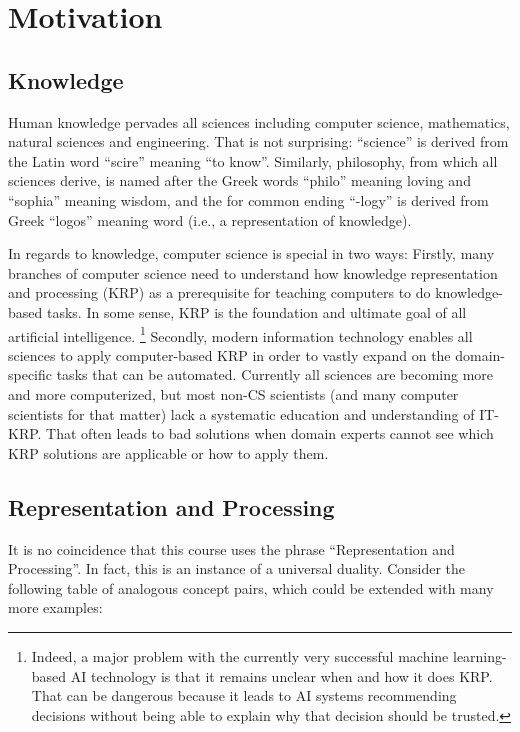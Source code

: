 \section{Motivation}

\subsection{Knowledge}

Human knowledge pervades all sciences including computer science, mathematics, natural sciences and engineering.
That is not surprising: ``science'' is derived from the Latin word ``scire'' meaning ``to know''.
Similarly, philosophy, from which all sciences derive, is named after the Greek words ``philo'' meaning loving and ``sophia'' meaning wisdom, and the for common ending ``-logy'' is derived from Greek ``logos'' meaning word (i.e., a representation of knowledge).

In regards to knowledge, computer science is special in two ways:
Firstly, many branches of computer science need to understand how knowledge representation and processing (KRP) as a prerequisite for teaching computers to do knowledge-based tasks.
In some sense, KRP is the foundation and ultimate goal of all artificial intelligence.%
\footnote{Indeed, a major problem with the currently very successful machine learning-based AI technology is that it remains unclear when and how it does KRP. That can be dangerous because it leads to AI systems recommending decisions without being able to explain why that decision should be trusted.}
Secondly, modern information technology enables all sciences to apply computer-based KRP in order to vastly expand on the domain-specific tasks that can be automated.
Currently all sciences are becoming more and more computerized, but most non-CS scientists (and many computer scientists for that matter) lack a systematic education and understanding of IT-KRP.
That often leads to bad solutions when domain experts cannot see which KRP solutions are applicable or how to apply them.

\subsection{Representation and Processing}

It is no coincidence that this course uses the phrase ``Representation and Processing''.
In fact, this is an instance of a universal duality.
Consider the following table of analogous concept pairs, which could be extended with many more examples:

